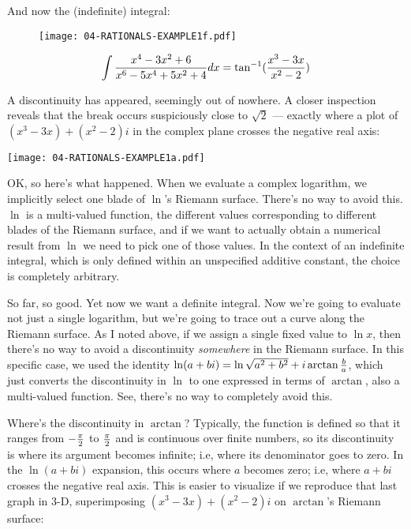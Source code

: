 And now the (indefinite) integral:

\begin{figure}[!h]
\begin{center}
\texttt{[image: 04-RATIONALS-EXAMPLE1f.pdf]}
\end{center}
$$\int {{x^4-3x^2+6}\over{x^6-5x^4+5x^2+4}} dx =
\tan^{-1}({{x^3-3x}\over{x^2-2}})$$
\end{figure}

\vfill\eject

A discontinuity has appeared, seemingly out of nowhere.  A closer
inspection reveals that the break occurs suspiciously close to
$\sqrt{2}$ --- exactly where a plot of $(x^3-3x)+(x^2-2)i$ in
the complex plane crosses the negative real axis:

\begin{center}
\texttt{[image: 04-RATIONALS-EXAMPLE1a.pdf]}
\end{center}

OK, so here's what happened.  When we evaluate a complex logarithm, we
implicitly select one blade of $\ln$'s Riemann surface.  There's no
way to avoid this.  $\ln$ is a multi-valued function, the different
values corresponding to different blades of the Riemann surface, and
if we want to actually obtain a numerical result from $\ln$ we need to
pick one of those values.  In the context of an indefinite integral,
which is only defined within an unspecified additive constant, the
choice is completely arbitrary.

So far, so good.  Yet now we want a definite integral.  Now we're
going to evaluate not just a single logarithm, but we're going to
trace out a curve along the Riemann surface.  As I noted above, if we
assign a single fixed value to $\ln x$, then there's no way to avoid a
discontinuity {\it somewhere} in the Riemann surface.  In this
specific case, we used the identity $\ln(a+bi) = \ln\sqrt{a^2+b^2}
+i\arctan{b\over a}$, which just converts the discontinuity in $\ln$
to one expressed in terms of $\arctan$, also a multi-valued function.
See, there's no way to completely avoid this.

Where's the discontinuity in $\arctan$?  Typically, the function is
defined so that it ranges from $-{\pi\over2}$ to ${\pi\over2}$ and is
continuous over finite numbers, so its discontinuity is where its
argument becomes infinite; i.e, where its denominator goes to zero.
In the $\ln(a+bi)$ expansion, this occurs where $a$ becomes zero; i.e,
where $a+bi$ crosses the negative real axis.  This is easier to visualize
if we reproduce that last graph in 3-D, superimposing $(x^3-3x)+(x^2-2)i$
on $\arctan$'s Riemann surface:

